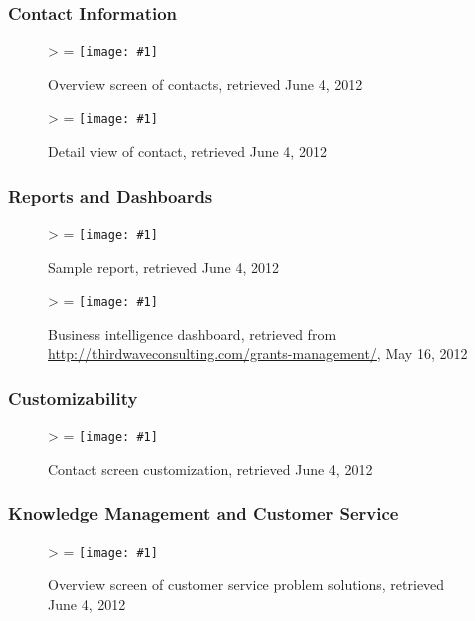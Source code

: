 \documentclass[11pt,letterpaper]{article}
\newcommand{\downloadDate}{May 16, 2012}
\newlength{\imgwidth}
\newlength{\imgheight}
\newlength{\finalwidth}
\newlength{\finalheight}
\newlength{\imgtextheight}
\newcommand{\scalegraphics}[1]{%
	\settowidth{\imgwidth}{\texttt{[image: \#1]}}%
	\settoheight{\imgheight}{\texttt{[image: \#1]}}%
	\ifnum\imgwidth>\imgheight \def\imgangle{90} \else \def\imgangle{0} \fi%
	\setlength{\imgtextheight}{0.74\textheight}%
	\setlength{\finalwidth}{\minof{\imgwidth}{\textwidth}}%
	\setlength{\finalheight}{\minof{\imgheight}{\imgtextheight}}%
	\ifnum\finalwidth=\imgwidth \def\imgangle{0} \fi%
	\texttt{[image: \#1]}%
}
\begin{document}
\FloatBarrier
\subsubsection{Contact Information}
\begin{figure}[htbp]
	\centering
	\scalegraphics{./img/force/frce_contacts}
	\caption[salesforce.com: Overview screen of contacts]{Overview screen of contacts, retrieved June 4, 2012}
\end{figure}

\begin{figure}[htbp]
	\centering
	\scalegraphics{./img/force/frce_contact_detail}
	\caption[salesforce.com: Detail view of contact]{Detail view of contact, retrieved June 4, 2012}
\end{figure}

\newpage
\FloatBarrier
\subsubsection{Reports and Dashboards}
\begin{figure}[htbp]
	\centering
	\scalegraphics{./img/force/frce_report}
	\caption[salesforce.com: Sample report]{Sample report, retrieved June 4, 2012}
\end{figure}

\begin{figure}[htbp]
	\centering
	\scalegraphics{./img/force/frce_dashboard}
	\caption[salesforce.com: Business intelligence dashboard]{Business intelligence dashboard, retrieved from \url{http://thirdwaveconsulting.com/grants-management/}, \downloadDate}
\end{figure}

\newpage
\FloatBarrier
\subsubsection{Customizability}
\begin{figure}[htbp]
	\centering
	\scalegraphics{./img/force/frce_customize_contact}
	\caption[salesforce.com: Contact screen customization]{Contact screen customization, retrieved June 4, 2012}
\end{figure}

\newpage
\FloatBarrier
\subsubsection{Knowledge Management and Customer Service}
\begin{figure}[htbp]
	\centering
	\scalegraphics{./img/force/frce_solution_list}
	\caption[salesforce.com: Overview screen of customer service problem solutions]{Overview screen of customer service problem solutions, retrieved June 4, 2012}
\end{figure}
\end{document}

